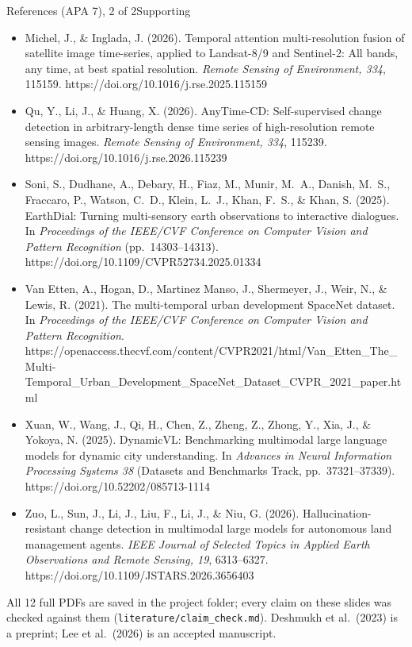 \documentclass[aspectratio=169,11pt]{beamer}
\begin{document}
\begin{frame}[shrink=8]{References (APA 7), 2 of 2}{Supporting}
\scriptsize
\begin{itemize}
\item Michel, J., \& Inglada, J. (2026). Temporal attention multi-resolution fusion of satellite image time-series, applied to Landsat-8/9 and Sentinel-2: All bands, any time, at best spatial resolution. \emph{Remote Sensing of Environment, 334}, 115159. https://doi.org/10.1016/j.rse.2025.115159
\item Qu, Y., Li, J., \& Huang, X. (2026). AnyTime-CD: Self-supervised change detection in arbitrary-length dense time series of high-resolution remote sensing images. \emph{Remote Sensing of Environment, 334}, 115239. https://doi.org/10.1016/j.rse.2026.115239
\item Soni, S., Dudhane, A., Debary, H., Fiaz, M., Munir, M.~A., Danish, M.~S., Fraccaro, P., Watson, C.~D., Klein, L.~J., Khan, F.~S., \& Khan, S. (2025). EarthDial: Turning multi-sensory earth observations to interactive dialogues. In \emph{Proceedings of the IEEE/CVF Conference on Computer Vision and Pattern Recognition} (pp.~14303--14313). https://doi.org/10.1109/CVPR52734.2025.01334
\item Van Etten, A., Hogan, D., Martinez Manso, J., Shermeyer, J., Weir, N., \& Lewis, R. (2021). The multi-temporal urban development SpaceNet dataset. In \emph{Proceedings of the IEEE/CVF Conference on Computer Vision and Pattern Recognition}. https://openaccess.thecvf.com/content/CVPR2021/html/Van\_Etten\_The\_Multi-Temporal\_Urban\_Development\_SpaceNet\_Dataset\_CVPR\_2021\_paper.html
\item Xuan, W., Wang, J., Qi, H., Chen, Z., Zheng, Z., Zhong, Y., Xia, J., \& Yokoya, N. (2025). DynamicVL: Benchmarking multimodal large language models for dynamic city understanding. In \emph{Advances in Neural Information Processing Systems 38} (Datasets and Benchmarks Track, pp.~37321--37339). https://doi.org/10.52202/085713-1114
\item Zuo, L., Sun, J., Li, J., Liu, F., Li, J., \& Niu, G. (2026). Hallucination-resistant change detection in multimodal large models for autonomous land management agents. \emph{IEEE Journal of Selected Topics in Applied Earth Observations and Remote Sensing, 19}, 6313--6327. https://doi.org/10.1109/JSTARS.2026.3656403
\end{itemize}
{\color{muted} All 12 full PDFs are saved in the project folder; every claim on these slides was checked against them (\texttt{literature/claim\_check.md}). Deshmukh et al.\ (2023) is a preprint; Lee et al.\ (2026) is an accepted manuscript.}
\end{frame}
\end{document}
